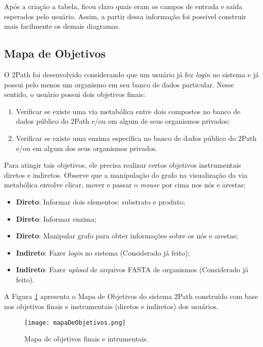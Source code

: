 \indent Após a criação a tabela, ficou claro quais eram os campos de entrada e saída esperados pelo usuário. Assim, a partir dessa informação foi possível construir mais facilmente os demais diagramas.

\subsection{Mapa de Objetivos}

\indent O 2Path foi desenvolvido considerando que um usuário já fez \textit{login} no sistema e já possui pelo menos um organismo em seu banco de dados particular. Nesse sentido, o usuário possui dois objetivos finais:
\begin{enumerate}
\item Verificar se existe uma via metabólica entre dois compostos no banco de dados público do 2Path e/ou em algum de seus organismos privados;
\item Verificar se existe uma enzima específica no banco de dados público do 2Path e/ou em algum dos seus organismos privados. 
\end{enumerate}

\indent Para atingir tais objetivos, ele precisa realizar certos objetivos instrumentais diretos e indiretos. Observe que a manipulação do grafo na visualização da via metabólica envolve clicar, mover e passar o \textit{mouse} por cima nos nós e arestas:
\begin{itemize}
\item \textbf{Direto}: Informar dois elementos: substrato e produto;
\item \textbf{Direto}: Informar enzima;
\item \textbf{Direto}: Manipular grafo para obter informações sobre os nós e arestas;
\item \textbf{Indireto}: Fazer \textit{login} no sistema (Considerado já feito);
\item \textbf{Indireto}: Fazer \textit{upload} de arquivos FASTA de organismos (Considerado já feito).
\end{itemize}

\indent A Figura \ref{fig:mapaDeObjetivos} apresenta o Mapa de Objetivos do sistema 2Path construído com base nos objetivos finais e instrumentais (diretos e indiretos) dos usuários. 

\begin{figure}[!h] 
	\centering
	\texttt{[image: mapaDeObjetivos.png]}
	\caption{Mapa de objetivos finais e intrumentais.}
	\label{fig:mapaDeObjetivos}
\end{figure} 


